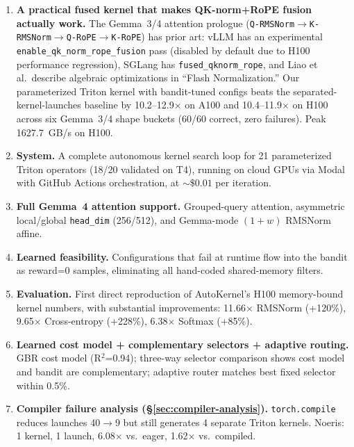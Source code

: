 \documentclass[11pt]{article}
\begin{document}
\begin{enumerate}[leftmargin=*,itemsep=2pt]

\item \textbf{A practical fused kernel that makes QK-norm+RoPE fusion actually
work.} The Gemma~3/4 attention prologue
(\texttt{Q-RMSNorm}$\to$\texttt{K-RMSNorm}$\to$\texttt{Q-RoPE}$\to$\texttt{K-RoPE})
has prior art: vLLM has an experimental \texttt{enable\_qk\_norm\_rope\_fusion}
pass (disabled by default due to H100 performance regression), SGLang has
\texttt{fused\_qknorm\_rope}, and Liao et al.\ describe algebraic optimizations
in ``Flash Normalization.'' Our parameterized Triton kernel with bandit-tuned
configs beats the separated-kernel-launches baseline by 10.2--12.9$\times$ on
A100 and 10.4--11.9$\times$ on H100 across six Gemma~3/4 shape buckets (60/60
correct, zero failures). Peak 1627.7~GB/s on H100.

\item \textbf{System.} A complete autonomous kernel search loop for 21
parameterized Triton operators (18/20 validated on T4), running on cloud GPUs
via Modal with GitHub Actions orchestration, at ${\sim}\$0.01$ per iteration.

\item \textbf{Full Gemma~4 attention support.} Grouped-query attention, asymmetric
local/global \texttt{head\_dim} (256/512), and Gemma-mode $(1+w)$ RMSNorm affine.

\item \textbf{Learned feasibility.} Configurations that fail at runtime flow
into the bandit as reward=0 samples, eliminating all hand-coded shared-memory
filters.

\item \textbf{Evaluation.} First direct reproduction of AutoKernel's H100
memory-bound kernel numbers, with substantial improvements: 11.66$\times$
RMSNorm (+120\%), 9.65$\times$ Cross-entropy (+228\%), 6.38$\times$ Softmax
(+85\%).

\item \textbf{Learned cost model + complementary selectors + adaptive routing.}
GBR cost model (R$^2$=0.94); three-way selector comparison shows cost model and
bandit are complementary; adaptive router matches best fixed selector within
0.5\%.

\item \textbf{Compiler failure analysis (\S\ref{sec:compiler-analysis}).}
\texttt{torch.compile} reduces launches 40$\to$9 but still generates 4 separate
Triton kernels. Noeris: 1 kernel, 1 launch, 6.08$\times$ vs.\ eager, 1.62$\times$ vs.\
compiled.


\end{enumerate}
\end{document}

